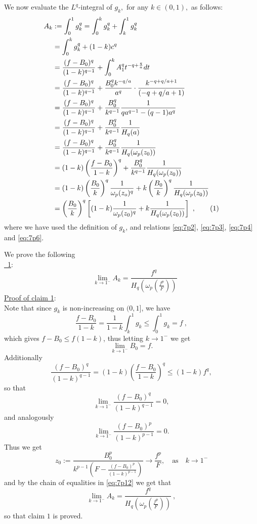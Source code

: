 \documentclass{article}
\numberwithin{equation}{section}
\theoremstyle{definition}
\theoremstyle{remark}
\newcommand\numberthis{\addtocounter{equation}{1}\tag{\theequation}}
\begin{document}
\vspace{5mm}

\noindent We now evaluate the $L^q$-integral of $g_k,$ for any $k \in (0,1),$ as follows:
%
\begin{align*}
    A_k &:= \int_0^1 g_k^q = \int_0^k g_k^q + \int_k^1 g_k^q \\
    &= \int_0^k g_k^q + (1-k)c^q \\
    &= \frac{(f-B_0)^q}{(1-k)^{q-1}} + \int_0^k A_1^q t^{-q+\frac{q}{a}}dt \\
    &= \frac{(f-B_0)^q}{(1-k)^{q-1}} + \frac{B_0^q k^{-q/a}}{a^q} \cdot \frac{k^{-q+q/a+1}}{(-q+q/a+1)} \\
    &= \frac{(f-B_0)^q}{(1-k)^{q-1}} + \frac{B_0^q}{k^{q-1}} \frac{1}{qa^{q-1}-(q-1)a^q} \\
    &= \frac{(f-B_0)^q}{(1-k)^{q-1}} + \frac{B_0^q}{k^{q-1}} \frac{1}{H_q(a)} \\
    &= \frac{(f-B_0)^q}{(1-k)^{q-1}} + \frac{B_0^q}{k^{q-1}} \frac{1}{H_q(\omega_p(z_0))} \\
    &= (1-k) \left ( \frac{f-B_0}{1-k} \right )^q + \frac{B_0^q}{k^{q-1}} \frac{1}{H_q(\omega_p(z_0))} \\
    &= (1-k) \left ( \frac{B_0}{k} \right )^q \frac{1}{\omega_p(z_o)^q} + k \left ( \frac{B_0}{k} \right )^q \frac{1}{H_q(\omega_p(z_0))} \\
    &= \left ( \frac{B_0}{k} \right )^q \left [(1-k) \frac{1}{\omega_p(z_0)^q} + k \frac{1}{H_q(\omega_p(z_0))}  \right ] \ , \numberthis \label{eq:7p12}
\end{align*}
%
where we have used the definition of $g_k$, and relations \eqref{eq:7p2}, \eqref{eq:7p3}, \eqref{eq:7p4} and \eqref{eq:7p6}.

\vspace{5mm}

\noindent We prove the following \\

\noindent \underline{ \ 1}:
\[
 \quad \lim \limits_{k \to 1^-} A_k = \frac{f^q}{H_q \left (\omega_p \left ( \frac{f^p}{F} \right ) \right )}
\]
%
\underline{Proof of claim 1}: \\

\noindent Note that since $g_k$ is non-increasing on $(0,1]$, we have
\[
\frac{f-B_0}{1-k} = \frac{1}{1-k} \int_k^1 g_k \leq \int_0^1 g_k = f \ ,
\]
%
which gives $f-B_0\leq f(1-k)$, thus letting $k \to 1^-$ we get
\[
\lim \limits_{k \to 1^-} B_0 = f .
\]
%
Additionally
\[
\frac{(f-B_0)^q}{(1-k)^{q-1}} = (1-k) \left ( \frac{f-B_0}{1-k} \right )^q \leq (1-k) f^q ,
\]
%
so that
\[
\lim \limits_{k \to 1^-} \frac{(f-B_0)^q}{(1-k)^{q-1}} = 0 ,
\]
%
and analogously $$\lim \limits_{k \to 1^-} \frac{(f-B_0)^p}{(1-k)^{p-1}} = 0 . $$ Thus we get
\[
z_0 := \frac{B_0^p}{k^{p-1}\left ( F - \frac{(f-B_0)^p}{(1-k)^{p-1}} \right ) } \rightarrow \frac{f^p}{F} , \quad \text{as} \quad k \to 1^-
\]
%
and by the chain of equalities in \eqref{eq:7p12} we get that
\[
\lim \limits_{k \to 1^-} A_k = \frac{f^q}{H_q \left ( \omega_p \left ( \frac{f^p}{F} \right ) \right )} \ , 
\]
%
so that claim $1$ is proved. \\
\end{document}
